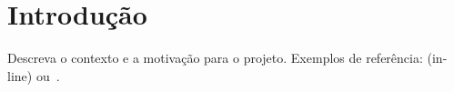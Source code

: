 
\section{Introdução}
\label{sec-intro}

Descreva o contexto e a motivação para o projeto. Exemplos de referência:  (in-line) ou~\cite{guarino-et-al:hobook09}.
